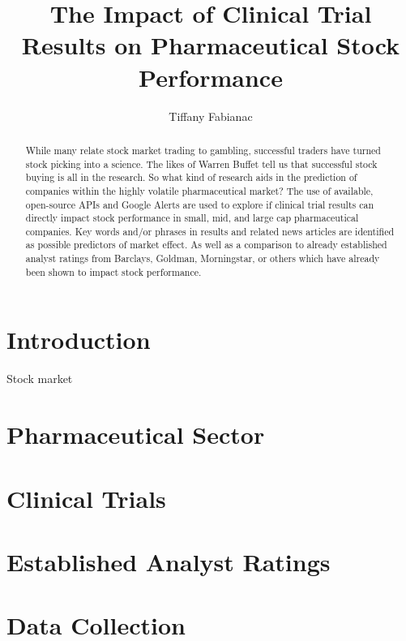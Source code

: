 \documentclass[sigconf]{acmart}
\begin{document}
\title{The Impact of Clinical Trial Results on Pharmaceutical Stock Performance}

\author{Tiffany Fabianac} 
 \renewcommand{\shortauthors}{T. Fabianac} 

\begin{abstract}
While many relate stock market trading to gambling, successful traders have turned stock picking into a science. The likes of Warren Buffet tell us that successful stock buying is all in the research. So what kind of research aids in the prediction of companies within the highly volatile pharmaceutical market? The use of available, open-source APIs and Google Alerts are used to explore if clinical trial results can directly impact stock performance in small, mid, and large cap pharmaceutical companies. Key words and/or phrases in results and related news articles are identified as possible predictors of market effect. As well as a comparison to already established analyst ratings from Barclays, Goldman, Morningstar, or others which have already been shown to impact stock performance.
\end{abstract}

\maketitle
\section{Introduction}
Stock market 


\section{Pharmaceutical Sector}

\section{Clinical Trials}


\section{Established Analyst Ratings}


\section{Data Collection}
\end{document}
